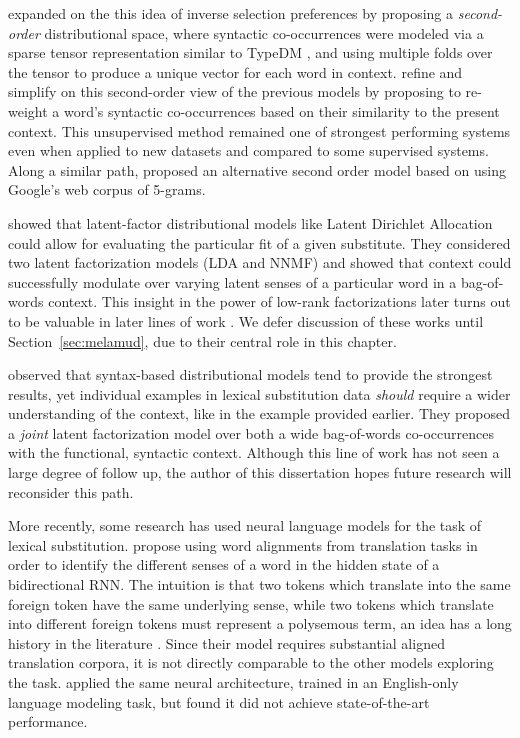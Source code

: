 expanded on the this idea of inverse
selection preferences by proposing a {\em second-order} distributional space,
where syntactic co-occurrences were modeled via a sparse tensor representation
similar to TypeDM \cite{baroni:2011:gems}, and using multiple folds over the
tensor to produce a unique vector for each word in context.
 refine and simplify on this second-order view of
the previous models by proposing to re-weight a word's syntactic co-occurrences
based on their similarity to the present context.
This unsupervised method remained one of strongest performing systems even when
applied to new datasets \cite{kremer:2014:eacl} and compared to some
supervised systems. Along a similar path,  proposed
an alternative second order model based on using Google's web corpus of
5-grams.

 showed that latent-factor distributional models like
Latent Dirichlet Allocation \cite{blei:2003:jmlr} could allow for evaluating
the particular fit of a given substitute. They considered two latent
factorization models (LDA and NNMF) and showed that context could successfully
modulate over varying latent senses of a particular word in a bag-of-words
context. This insight in the power of low-rank factorizations later turns
out to be valuable in later lines of work
\cite{melamud:2015:vsm,roller:2016:naacl}. We defer discussion of these works
until Section~\ref{sec:melamud}, due to their central role in this chapter.

 observed that syntax-based distributional
models tend to provide the strongest results, yet individual examples in
lexical substitution data {\em should} require a wider understanding of the
context, like in the  example provided earlier. They proposed a
{\em joint} latent factorization model over both a wide bag-of-words
co-occurrences with the functional, syntactic context. Although this line of
work has not seen a large degree of follow up, the author of this dissertation
hopes future research will reconsider this path.

More recently, some research has used neural language models for the task
of lexical substitution.  propose using word
alignments from translation tasks in order to identify the different senses of
a word in the hidden state of a bidirectional RNN. The intuition is that two
tokens which translate into the same foreign token have the same underlying
sense, while two tokens which translate into different foreign tokens must
represent a polysemous term, an idea has a long history in the literature
\cite{resnik:1999:nle,diab:2003:phd,bannard:2005:acl}. Since their model
requires substantial aligned translation corpora, it is not directly comparable
to the other models exploring the task. 
applied the same neural architecture, trained in an English-only language
modeling task, but found it did not achieve state-of-the-art performance.

